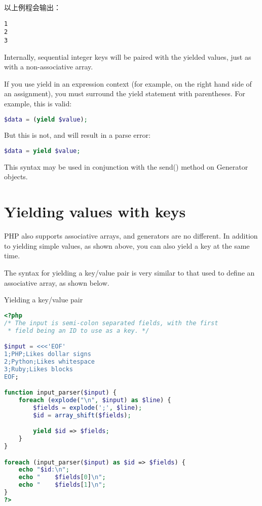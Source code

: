 以上例程会输出：

\begin{verbatim}
1
2
3
\end{verbatim}

Internally, sequential integer keys will be paired with the yielded values, just as with a non-associative array.

If you use yield in an expression context (for example, on the right hand side of an assignment), you must surround the yield statement with parentheses. For example, this is valid:

\begin{lstlisting}[language=PHP]
$data = (yield $value);
\end{lstlisting}

But this is not, and will result in a parse error:

\begin{lstlisting}[language=PHP]
$data = yield $value;
\end{lstlisting}

This syntax may be used in conjunction with the send() method on Generator objects.


\section{Yielding values with keys}


PHP also supports associative arrays, and generators are no different. In addition to yielding simple values, as shown above, you can also yield a key at the same time.

The syntax for yielding a key/value pair is very similar to that used to define an associative array, as shown below.



\begin{example}
Yielding a key/value pair
\begin{lstlisting}[language=PHP]
<?php
/* The input is semi-colon separated fields, with the first
 * field being an ID to use as a key. */

$input = <<<'EOF'
1;PHP;Likes dollar signs
2;Python;Likes whitespace
3;Ruby;Likes blocks
EOF;

function input_parser($input) {
    foreach (explode("\n", $input) as $line) {
        $fields = explode(';', $line);
        $id = array_shift($fields);

        yield $id => $fields;
    }
}

foreach (input_parser($input) as $id => $fields) {
    echo "$id:\n";
    echo "    $fields[0]\n";
    echo "    $fields[1]\n";
}
?>
\end{lstlisting}
\end{example}

